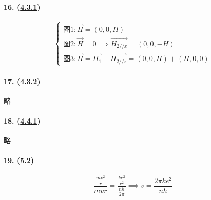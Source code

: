 \paragraph{16. (\hyperref[subsec:4.3.1]{4.3.1})}

\begin{equation*}
    \begin{cases}
        \textrm{图1}: \vec{H}=(0,0,H)\\
        \textrm{图2}: \vec{H}=0\implies \vec{H_{2//x}}=(0,0,-H)\\
        \textrm{图3}: \vec{H}=\vec{H_1}+\vec{H_{2//z}}=(0,0,H)+(H,0,0)
    \end{cases}
\end{equation*}

\paragraph{17. (\hyperref[subsec:4.3.2]{4.3.2})} 略
\paragraph{18. (\hyperref[subsec:4.4.1]{4.4.1})} 略
\paragraph{19. (\hyperref[sec:5.2]{5.2})}

\begin{equation*}
    \frac{\frac{mv^2}{r}}{mvr}=\frac{\frac{ke^2}{r^2}}{\frac{nh}{2\pi}}\implies
    v=\frac{2\pi ke^2}{nh}
\end{equation*}
